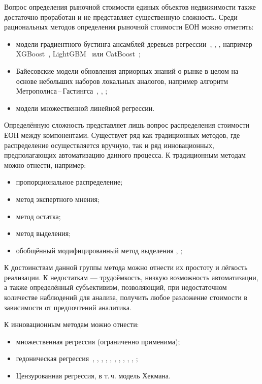 \documentclass[12pt]{scrartcl}
\begin{document}
Вопрос определения рыночной стоимости единых объектов недвижимости также достаточно проработан и не представляет существенную сложность. Среди рациональных методов определения рыночной стоимости ЕОН можно отметить:
\begin{itemize}
    \item модели градиентного бустинга ансамблей деревьев регрессии~\cite{Hastie2017}, \cite{Li}, \cite{Breiman}, например XGBoost~\cite{XGBoost}, LightGBM~\cite{LightGBM} или CatBoost~\cite{CatBoost};
    \item Байесовские модели обновления априорных знаний о рынке в целом на основе небольших наборов локальных аналогов, например алгоритм Метрополиса\,--\,Гастингса~\cite{Kalos1986}, \cite{Tierney1994}, \cite{Hastings1970};
    \item модели множественной линейной регрессии.
\end{itemize}

Определённую сложность представляет лишь вопрос распределения стоимости ЕОН между компонентами. Существует ряд как традиционных методов, где распределение осуществляется вручную, так и ряд инновационных, предполагающих автоматизацию данного процесса. К традиционным методам можно отнести, например:
\begin{itemize}
    \item пропорциональное распределение;
    \item метод экспертного мнения;
    \item метод остатка;
    \item метод выделения;
    \item обобщённый модифицированный метод выделения \cite{Sloutzkiy_1}, \cite{Leifer_1};
\end{itemize}
К достоинствам данной группы метода можно отнести их простоту и лёгкость реализации. К недостаткам --- трудоёмкость, низкую возможность автоматизации, а также определённый субъективизм, позволяющий, при недостаточном количестве наблюдений для анализа, получить любое разложение стоимости в зависимости от предпочтений аналитика.

К инновационным методам можно отнести:
\begin{itemize}
    \item множественная регрессия (ограниченно применима);
    \item гедоническая регрессия~\cite{Rosen1974}, \cite{Court1939}, \cite{Chanel1996}, \cite{Pakko2020}, \cite{Malpezzi2002}, \cite{Sirmans2005}, \cite{Bourassa2006}, \cite{Goodman1998}, \cite{Kestens2006}, \cite{Tochaiwat2019}, \cite{BurhaidaBurhan2013};
    \item Цензурованная регрессия, в т.\,ч. модель Хекмана.
\end{itemize}





\printbibliography
\end{document}
